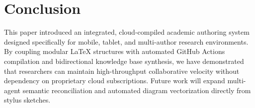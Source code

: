 \section{Conclusion}
\label{sec:conclusion}

This paper introduced an integrated, cloud-compiled academic authoring system designed specifically for mobile, tablet, and multi-author research environments. By coupling modular \LaTeX{} structures with automated GitHub Actions compilation and bidirectional knowledge base synthesis, we have demonstrated that researchers can maintain high-throughput collaborative velocity without dependency on proprietary cloud subscriptions. Future work will expand multi-agent semantic reconciliation and automated diagram vectorization directly from stylus sketches.
